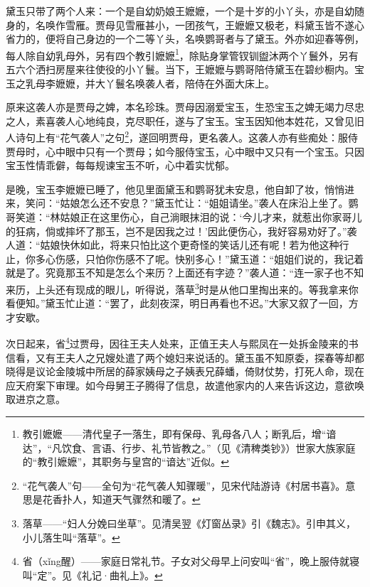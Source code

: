 \par 黛玉只带了两个人来：一个是自幼奶娘王嬷嬷，一个是十岁的小丫头，亦是自幼随身的，名唤作雪雁。贾母见雪雁甚小，一团孩气，王嬷嬷又极老，料黛玉皆不遂心省力的，便将自己身边的一个二等丫头，名唤鹦哥者与了黛玉。外亦如迎春等例，每人除自幼乳母外，另有四个教引嬷嬷\footnote{教引嬷嬷——清代皇子一落生，即有保母、乳母各八人；断乳后，增“谙达”，“凡饮食、言语、行步、礼节皆教之。”（见《清稗类钞》）世家大族家庭的“教引嬷嬷”，其职务与皇宫的“谙达”近似。}，除贴身掌管钗钏盥沐两个丫鬟外，另有五六个洒扫房屋来往使役的小丫鬟。当下，王嬷嬷与鹦哥陪侍黛玉在碧纱橱内。宝玉之乳母李嬷嬷，并大丫鬟名唤袭人者，陪侍在外面大床上。
\par 原来这袭人亦是贾母之婢，本名珍珠。贾母因溺爱宝玉，生恐宝玉之婢无竭力尽忠之人，素喜袭人心地纯良，克尽职任，遂与了宝玉。宝玉因知他本姓花，又曾见旧人诗句上有“花气袭人”之句\footnote{“花气袭人”句——全句为“花气袭人知骤暖”，见宋代陆游诗《村居书喜》。意思是花香扑人，知道天气骤然和暖了。}，遂回明贾母，更名袭人。这袭人亦有些痴处：服侍贾母时，心中眼中只有一个贾母；如今服侍宝玉，心中眼中又只有一个宝玉。只因宝玉性情乖僻，每每规谏宝玉不听，心中着实忧郁。
\par 是晚，宝玉李嬷嬷已睡了，他见里面黛玉和鹦哥犹未安息，他自卸了妆，悄悄进来，笑问：“姑娘怎么还不安息？”黛玉忙让：“姐姐请坐。”袭人在床沿上坐了。鹦哥笑道：“林姑娘正在这里伤心，自己淌眼抹泪的说：‘今儿才来，就惹出你家哥儿的狂病，倘或摔坏了那玉，岂不是因我之过！’因此便伤心，我好容易劝好了。”袭人道：“姑娘快休如此，将来只怕比这个更奇怪的笑话儿还有呢！若为他这种行止，你多心伤感，只怕你伤感不了呢。快别多心！”黛玉道：“姐姐们说的，我记着就是了。究竟那玉不知是怎么个来历？上面还有字迹？”袭人道：“连一家子也不知来历，上头还有现成的眼儿，听得说，落草\footnote{ 落草——“妇人分娩曰坐草”。见清吴翌《灯窗丛录》引《魏志》。引申其义，小儿落生叫“落草”。}时是从他口里掏出来的。等我拿来你看便知。”黛玉忙止道：“罢了，此刻夜深，明日再看也不迟。”大家又叙了一回，方才安歇。
\par 次日起来，省\footnote{省（xǐng醒）——家庭日常礼节。子女对父母早上问安叫“省”，晚上服侍就寝叫“定”。见《礼记·曲礼上》。}过贾母，因往王夫人处来，正值王夫人与熙凤在一处拆金陵来的书信看，又有王夫人之兄嫂处遣了两个媳妇来说话的。黛玉虽不知原委，探春等却都晓得是议论金陵城中所居的薛家姨母之子姨表兄薛蟠，倚财仗势，打死人命，现在应天府案下审理。如今母舅王子腾得了信息，故遣他家内的人来告诉这边，意欲唤取进京之意。




































